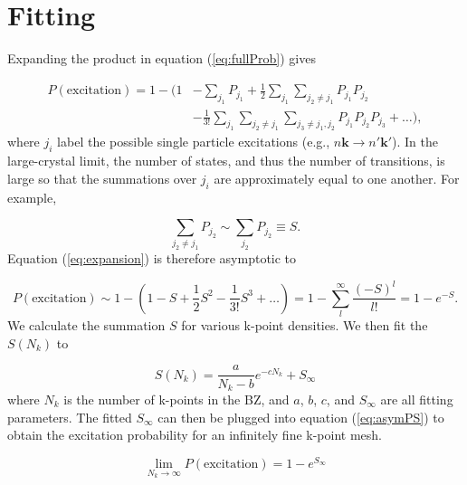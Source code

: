 \documentclass{article}
\begin{document}
\section{Fitting}
\label{app:fitting}

Expanding the product in equation (\ref{eq:fullProb}) gives

\begin{equation}
\label{eq:expansion}
\begin{aligned}
    P(\text{excitation})
    =
    1 - \Bigg(1
    &-
    \sum_{j_1} P_{j_1}
    +
    \frac{1}{2}\sum_{j_1}\sum_{j_2\neq j_1}P_{j_1}P_{j_2}
    \\&-
    \frac{1}{3!}\sum_{j_1}\sum_{j_2\neq j_1}
    \sum_{j_3\neq j_1,j_2}P_{j_1}P_{j_2}P_{j_3}
    +\dots\Bigg),
\end{aligned}
\end{equation}
%
where $j_i$ label the possible single particle excitations (e.g., $n\mathbf{k}\rightarrow n'\mathbf{k'}$).
In the large-crystal limit, the number of states, and thus the number of transitions, is large so that the summations over $j_i$ are approximately equal to one another.  For example,

\begin{equation}
    \sum_{j_2\neq j_1}P_{j_2}
    \sim
    \sum_{j_2}P_{j_2}
    \equiv
    S.
    \end{equation}
%
Equation (\ref{eq:expansion}) is therefore asymptotic to

\begin{equation}
\label{eq:asymPS}
    P(\text{excitation})
    \sim
    1 - \left(
    1 - S + \frac{1}{2}S^2 - \frac{1}{3!}S^3 + \dots
    \right)
    =
    1 - \sum_l^\infty \frac{(-S)^l}{l!}
    =
    1 - e^{-S}.
\end{equation}
%
We calculate the summation $S$ for various k-point densities.  We then fit the $S(N_k)$ to

\begin{equation}
    S(N_k)
    =
    \frac{a}{N_k-b}e^{-cN_k} + S_\infty
\end{equation}
%
where $N_k$ is the number of k-points in the BZ, and $a$, $b$, $c$, and $S_\infty$ are all fitting parameters.  The fitted $S_\infty$ can then be plugged into equation (\ref{eq:asymPS}) to obtain the excitation probability for an infinitely fine k-point mesh.

\begin{equation}
    \lim_{N_k\rightarrow\infty}P(\text{excitation}) = 1 - e^{S_\infty}
\end{equation}
\end{document}
